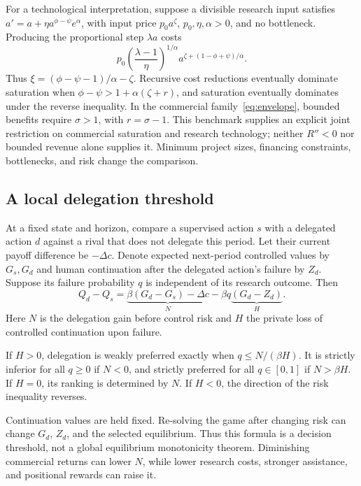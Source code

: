 For a technological interpretation, suppose a divisible research input satisfies $a'=a+\eta a^{\phi-\psi}e^\alpha$, with input price $p_0a^\zeta$, $p_0,\eta,\alpha>0$, and no bottleneck. Producing the proportional step $\lambda a$ costs
\begin{equation}
 p_0\left(\frac{\lambda-1}{\eta}\right)^{1/\alpha}
 a^{\zeta+(1-\phi+\psi)/\alpha}.
\end{equation}
Thus $\xi=(\phi-\psi-1)/\alpha-\zeta$. Recursive cost reductions eventually dominate saturation when $\phi-\psi>1+\alpha(\zeta+r)$, and saturation eventually dominates under the reverse inequality. In the commercial family~\eqref{eq:envelope}, bounded benefits require $\sigma>1$, with $r=\sigma-1$. This benchmark supplies an explicit joint restriction on commercial saturation and research technology; neither $R''<0$ nor bounded revenue alone supplies it. Minimum project sizes, financing constraints, bottlenecks, and risk change the comparison.

\subsection{A local delegation threshold}
At a fixed state and horizon, compare a supervised action $s$ with a delegated action $d$ against a rival that does not delegate this period. Let their current payoff difference be $-\Delta c$. Denote expected next-period controlled values by $G_s,G_d$ and human continuation after the delegated action's failure by $Z_d$. Suppose its failure probability $q$ is independent of its research outcome. Then
\begin{equation}\label{eq:delegationgap}
 Q_d-Q_s=\underbrace{\beta(G_d-G_s)-\Delta c}_{N}
       -\beta q\underbrace{(G_d-Z_d)}_{H}.
\end{equation}
Here $N$ is the delegation gain before control risk and $H$ the private loss of controlled continuation upon failure.

\begin{proposition}\label{prop:local}
If $H>0$, delegation is weakly preferred exactly when $q\leq N/(\beta H)$. It is strictly inferior for all $q\geq0$ if $N<0$, and strictly preferred for all $q\in[0,1]$ if $N>\beta H$. If $H=0$, its ranking is determined by $N$. If $H<0$, the direction of the risk inequality reverses.
\end{proposition}
Continuation values are held fixed. Re-solving the game after changing risk can change $G_d$, $Z_d$, and the selected equilibrium. Thus this formula is a decision threshold, not a global equilibrium monotonicity theorem. Diminishing commercial returns can lower $N$, while lower research costs, stronger assistance, and positional rewards can raise it.

